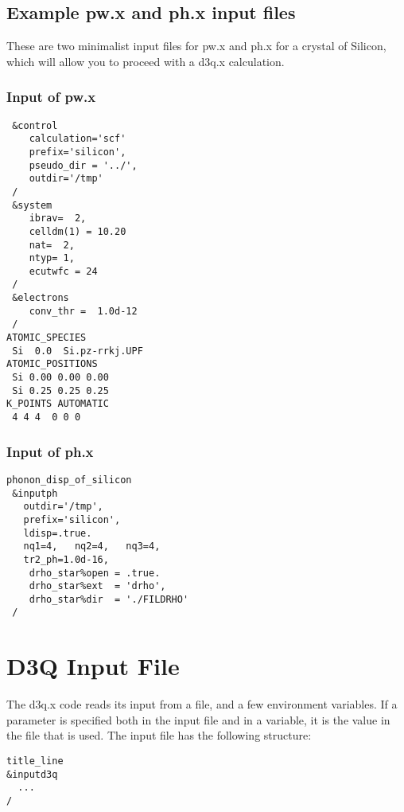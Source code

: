 \documentclass[
]{article}
\begin{document}
\hypertarget{example-pw.x-and-ph.x-input-files}{%
\subsection{Example pw.x and ph.x input
files}\label{example-pw.x-and-ph.x-input-files}}

These are two minimalist input files for pw.x and ph.x for a crystal of
Silicon, which will allow you to proceed with a d3q.x calculation.

\hypertarget{input-of-pw.x}{%
\subsubsection{Input of pw.x}\label{input-of-pw.x}}

\begin{verbatim}
 &control
    calculation='scf'
    prefix='silicon',
    pseudo_dir = '../',
    outdir='/tmp'
 /
 &system
    ibrav=  2,
    celldm(1) = 10.20
    nat=  2,
    ntyp= 1,
    ecutwfc = 24
 /
 &electrons
    conv_thr =  1.0d-12
 /
ATOMIC_SPECIES
 Si  0.0  Si.pz-rrkj.UPF
ATOMIC_POSITIONS
 Si 0.00 0.00 0.00
 Si 0.25 0.25 0.25
K_POINTS AUTOMATIC
 4 4 4  0 0 0
\end{verbatim}

\hypertarget{input-of-ph.x}{%
\subsubsection{Input of ph.x}\label{input-of-ph.x}}

\begin{verbatim}
phonon_disp_of_silicon
 &inputph
   outdir='/tmp',
   prefix='silicon',
   ldisp=.true.
   nq1=4,   nq2=4,   nq3=4,
   tr2_ph=1.0d-16,
    drho_star%open = .true.
    drho_star%ext  = 'drho',
    drho_star%dir  = './FILDRHO'
 /
\end{verbatim}

\hypertarget{d3q-input-file}{%
\section{D3Q Input File}\label{d3q-input-file}}

The d3q.x code reads its input from a file, and a few environment
variables. If a parameter is specified both in the input file and in a
variable, it is the value in the file that is used. The input file has
the following structure:

\begin{verbatim}
title_line
&inputd3q
  ...
/
\end{verbatim}
\end{document}
